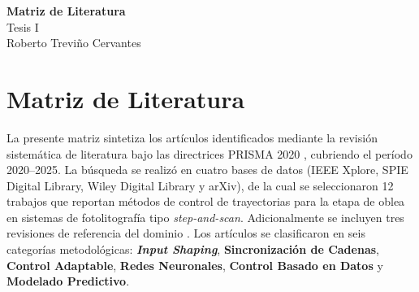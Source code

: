 \documentclass[11pt]{article}
\theoremstyle{definition}
\begin{document}
\setcounter{section}{0}

\thispagestyle{empty}

\begin{center}
{\LARGE \bf Matriz de Literatura}\\[4pt]
{\large Tesis I}\\[2pt]
Roberto Treviño Cervantes
\end{center}

\section{Matriz de Literatura}

La presente matriz sintetiza los artículos identificados mediante la revisión sistemática de literatura bajo las directrices PRISMA 2020 \supercite{Page2021_PRISMA}, cubriendo el período 2020--2025. La búsqueda se realizó en cuatro bases de datos (IEEE Xplore, SPIE Digital Library, Wiley Digital Library y arXiv), de la cual se seleccionaron 12 trabajos que reportan métodos de control de trayectorias para la etapa de oblea en sistemas de fotolitografía tipo \textit{step-and-scan}. Adicionalmente se incluyen tres revisiones de referencia del dominio \supercite{Song2021_Review, Heertjes2023_ICM, Heertjes2020_Control}. Los artículos se clasificaron en seis categorías metodológicas: \textbf{\textit{Input Shaping}}, \textbf{Sincronización de Cadenas}, \textbf{Control Adaptable}, \textbf{Redes Neuronales}, \textbf{Control Basado en Datos} y \textbf{Modelado Predictivo}.
\end{document}
